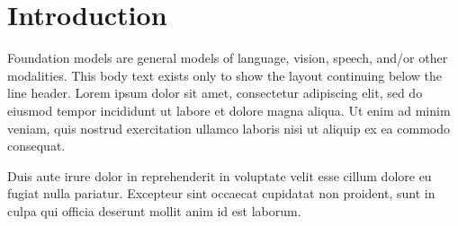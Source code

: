 \documentclass[11pt]{article}
\begin{document}

\begin{abstract}
Modern artificial intelligence (AI) systems are powered by foundation models
that increasingly act through external tools. When a tool call fails
silently, the agent's downstream reasoning proceeds on stale or fabricated
state. This paper presents Outcome Monitors, a lightweight observability
layer that detects unacknowledged tool failures from the conversation trace
alone. This abstract is placeholder text demonstrating the line-header
variant on the plain article class.
\end{abstract}

\section{Introduction}

Foundation models are general models of language, vision, speech, and/or
other modalities. This body text exists only to show the layout continuing
below the line header. Lorem ipsum dolor sit amet, consectetur adipiscing
elit, sed do eiusmod tempor incididunt ut labore et dolore magna aliqua. Ut
enim ad minim veniam, quis nostrud exercitation ullamco laboris nisi ut
aliquip ex ea commodo consequat.

Duis aute irure dolor in reprehenderit in voluptate velit esse cillum dolore
eu fugiat nulla pariatur. Excepteur sint occaecat cupidatat non proident,
sunt in culpa qui officia deserunt mollit anim id est laborum.
\end{document}
